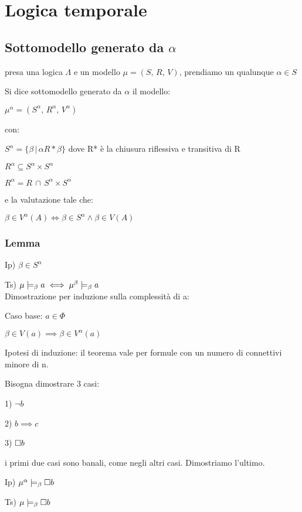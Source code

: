 
\chapter{	Logica temporale}


\section{Sottomodello generato da $\alpha$}

presa una logica $\Lambda$ e un modello $\mu=(S,\, R,\, V)$, prendiamo
un qualunque $\alpha\in S$

Si dice sottomodello generato da $\alpha$ il modello:

$\mu^{\alpha}=(S^{\alpha},\, R^{\alpha},\, V^{\alpha})$

con:

$S^{\alpha}=\{\beta\,|\,\alpha R*\beta\}$ dove R{*} è la chiusura
riflessiva e transitiva di R

$R^{\alpha}\subseteq S^{\alpha}\times S^{\alpha}$

$R^{\alpha}=R\,\cap\, S^{\alpha}\times S^{\alpha}$

e la valutazione tale che:

$\beta\in V^{\alpha}(A)\iff\beta\in S^{\alpha}\wedge\beta\in V(A)$


\subsection{Lemma}

Ip) $\beta\in S^{\alpha}$

Ts) $\mu\models_{\beta}a\iff\mu^{\beta}\models_{\beta}a$\\
Dimostrazione per induzione sulla complessità di a:

Caso base: $a\in\Phi$

$\beta\in V(a)\implies\beta\in V^{\alpha}(a)$

Ipotesi di induzione: il teorema vale per formule con un numero di
connettivi minore di n.

Bisogna dimostrare 3 casi:

1) $\neg b$

2) $b\implies c$

3) $\square b$

i primi due casi sono banali, come negli altri casi. Dimostriamo l'ultimo.

Ip) $\mu^{\alpha}\models_{\beta}\square b$ 

Ts) $\mu\models_{\beta}\square b$

